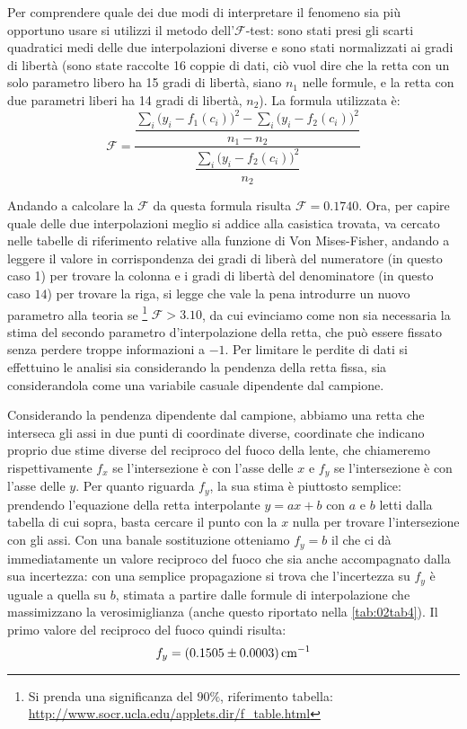 Per comprendere quale dei due modi di interpretare il fenomeno sia più opportuno usare si utilizzi il metodo dell'$\mathcal{F}$-test:
 sono stati presi gli scarti quadratici medi delle due interpolazioni diverse e sono stati normalizzati ai gradi di libertà
 (sono state raccolte 16 coppie di dati, ciò vuol dire che la retta con un solo parametro libero ha 15 gradi di libertà,
 siano $n_1$ nelle formule, e la retta con due parametri liberi ha 14 gradi di libertà, $n_2$).
 La formula utilizzata è:
\[\mathcal{F}=\frac{\dfrac{{\sum_i \big( y_i-f_1 (c_i) \big) ^2} - {\sum_i \big( y_i-f_2 (c_i) \big) ^2}}{n_1-n_2}}{\dfrac{\sum_i \big( y_i-f_2 
(c_i) \big) ^2}{n_2}}\]

Andando a calcolare la $\mathcal{F}$ da questa formula risulta $\mathcal{F} = 0.1740$. Ora, per capire quale delle due interpolazioni meglio si addice alla
 casistica trovata, va cercato nelle tabelle di riferimento relative alla funzione di Von Mises-Fisher, andando a leggere il valore
 in corrispondenza dei gradi di liberà del numeratore (in questo caso 1) per trovare la colonna e i gradi di libertà del denominatore
 (in questo caso $14$) per trovare la riga, si legge che vale la pena introdurre un nuovo parametro alla teoria 
 se \footnote{Si prenda una significanza del $90\%$, riferimento tabella: \url{http://www.socr.ucla.edu/applets.dir/f_table.html}} $\mathcal{F} > 3.10$, 
 da cui evinciamo come non sia necessaria la stima del secondo parametro d'interpolazione della retta, che può essere fissato senza perdere
 troppe informazioni a $-1$. Per limitare le perdite di dati si effettuino le analisi sia considerando la pendenza della retta fissa,
 sia considerandola come una variabile casuale dipendente dal campione.

Considerando la pendenza dipendente dal campione, abbiamo una retta che interseca gli assi in due punti di coordinate diverse,
 coordinate che indicano proprio due stime diverse del reciproco del fuoco della lente, che chiameremo rispettivamente
$f_x$ se l'intersezione è con l'asse delle $x$ e $f_y$ se l'intersezione è con l'asse delle $y$.
 Per quanto riguarda $f_y$, la sua stima è piuttosto semplice: prendendo l'equazione della retta interpolante $y=ax + b$
 con $a$ e $b$ letti dalla tabella di cui sopra, basta cercare il punto con la $x$ nulla per trovare l'intersezione con gli assi.
 Con una banale sostituzione otteniamo $f_y= b$ il che ci dà immediatamente un valore reciproco del fuoco che sia anche
 accompagnato dalla sua incertezza: con una semplice propagazione si trova che l'incertezza su $f_y$ è uguale a quella su $b$,
 stimata a partire dalle formule di interpolazione che massimizzano la verosimiglianza (anche questo riportato nella 
\autoref{tab:02tab4}).
 Il primo valore del reciproco del fuoco quindi risulta:
\[f_y = (0.1505 \pm 0.0003) \,\mathrm{cm}^{-1}\]

